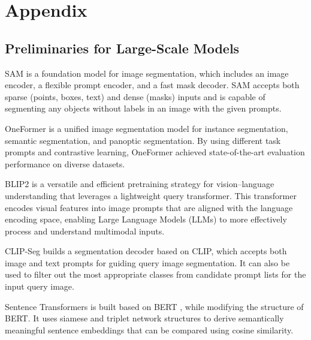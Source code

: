 \documentclass{article}
\theoremstyle{plain}
\theoremstyle{definition}
\theoremstyle{remark}
\begin{document}
\nocite{langley00}





\newpage
\appendix
\onecolumn
\section{Appendix}

\subsection{Preliminaries for Large-Scale Models}

SAM \cite{kirillov2023segment} is a foundation model for image segmentation, which includes an image encoder, a flexible prompt encoder, and a fast mask decoder. SAM accepts both sparse (points, boxes, text) and dense (masks) inputs and is capable of segmenting any objects without labels in an image with the given prompts.

OneFormer \cite{jain2023oneformer} is a unified image segmentation model for instance segmentation, semantic segmentation, and panoptic segmentation. By using different task prompts and contrastive learning, OneFormer achieved state-of-the-art evaluation performance on diverse datasets.

BLIP2 \cite{li2023blip} is a versatile and efficient pretraining strategy for vision–language understanding that leverages a lightweight query transformer. This transformer encodes visual features into image prompts that are aligned with the language encoding space, enabling Large Language Models (LLMs) to more effectively process and understand multimodal inputs.



CLIP-Seg \cite{luddecke2022image} builds a segmentation decoder based on CLIP, which accepts both image and text prompts for guiding query image segmentation. It can also be used to filter out the most appropriate classes from candidate prompt lists for the input query image.


Sentence Transformers \cite{reimers-2019-sentence-bert} is built based on BERT \cite{devlin2018bert}, while modifying the structure of BERT. It uses siamese and triplet network structures to derive semantically meaningful sentence embeddings that can be compared using cosine similarity. 
\end{document}
